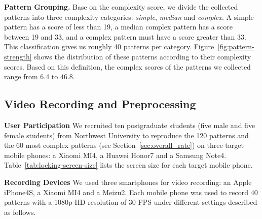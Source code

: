 
    \noindent \textbf{Pattern Grouping.}
    Base on the complexity score, we divide the collected patterns into three complexity categories: \emph{simple}, \emph{median} and \emph{complex}. A simple pattern has a score of less than 19,
    a median
    complex pattern has a score between 19 and 33, and a complex pattern must have a score greater than 33. This classification gives us roughly 40 patterns per
    category.
    Figure~\ref{fig:pattern-strength} shows the distribution of these patterns according to their complexity scores.
    Based on this definition,
    the complex scores of the patterns we collected range from $6.4$ to $46.8$.

    \vspace{-4mm}
    \subsection{Video Recording and Preprocessing}

    \noindent\textbf{User Participation} We recruited ten postgraduate students (five male and five female
    students) from Northwest University to reproduce the 120 patterns
    and the 60 most complex patterns (see Section~\ref{sec:overall_rate})  on three target mobile phones:
    a Xiaomi MI4, a Huawei Honor7 and a Samsung Note4. Table~\ref{tab:locking-screen-size} lists
    the screen size for each target mobile phone.

    \noindent\textbf{Recording Devices} We used three smartphones for video recording: an Apple iPhone4S,
     a Xiaomi MI4 and a Meizu2. Each mobile phone was used to record 40 patterns with a
    1080p HD resolution of 30 FPS under different settings described as follows.

